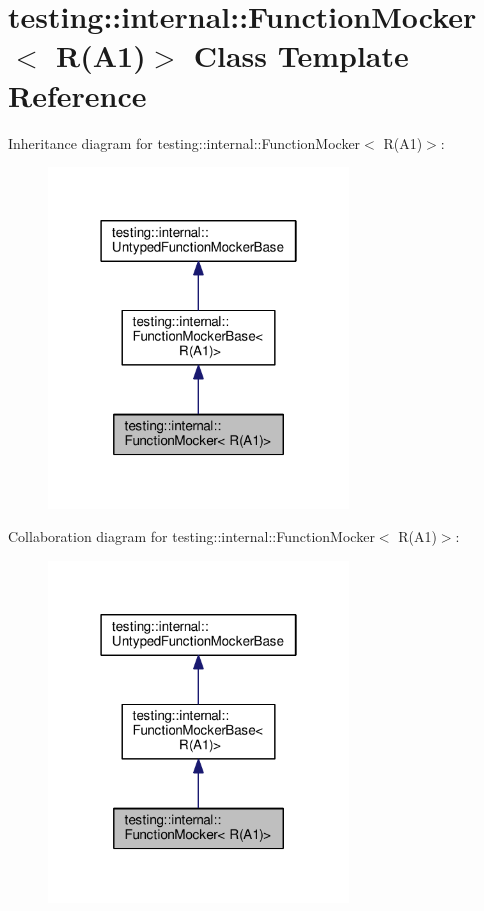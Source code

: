 \hypertarget{classtesting_1_1internal_1_1_function_mocker_3_01_r_07_a1_08_4}{}\section{testing\+:\+:internal\+:\+:Function\+Mocker$<$ R(A1)$>$ Class Template Reference}
\label{classtesting_1_1internal_1_1_function_mocker_3_01_r_07_a1_08_4}


Inheritance diagram for testing\+:\+:internal\+:\+:Function\+Mocker$<$ R(A1)$>$\+:
\nopagebreak
\begin{figure}[H]
\begin{center}
\leavevmode
\includegraphics[width=226pt]{classtesting_1_1internal_1_1_function_mocker_3_01_r_07_a1_08_4__inherit__graph}
\end{center}
\end{figure}


Collaboration diagram for testing\+:\+:internal\+:\+:Function\+Mocker$<$ R(A1)$>$\+:
\nopagebreak
\begin{figure}[H]
\begin{center}
\leavevmode
\includegraphics[width=226pt]{classtesting_1_1internal_1_1_function_mocker_3_01_r_07_a1_08_4__coll__graph}
\end{center}
\end{figure}
